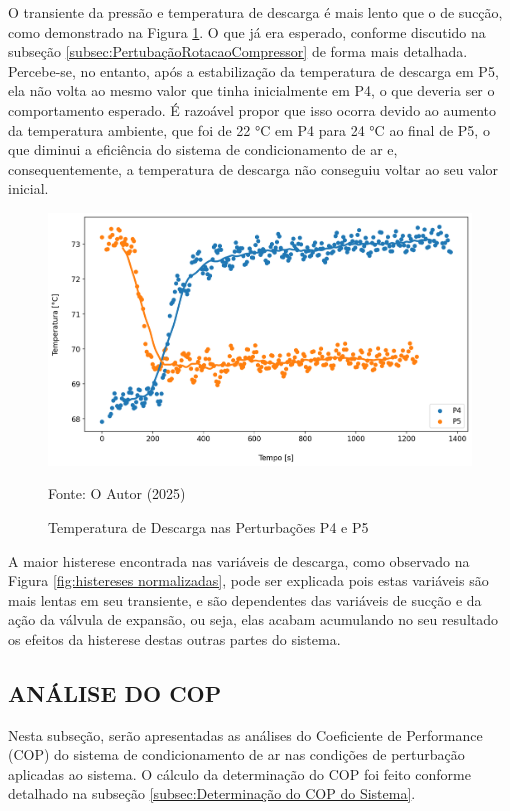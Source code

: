 O transiente da pressão e temperatura de descarga é mais lento que o de sucção, como demonstrado na Figura \ref{fig:TempDescargaSubidaeDescida}. O que já era esperado, conforme discutido na subseção \ref{subsec:PertubaçãoRotacaoCompressor} de forma mais detalhada.
Percebe-se, no entanto, após a estabilização da temperatura de descarga em P5, ela não volta ao mesmo valor que tinha inicialmente em P4, o que deveria ser o comportamento esperado. É razoável propor que isso ocorra devido ao aumento da temperatura ambiente, que foi de 22 °C em P4 para 24 °C ao final de P5, o que diminui a eficiência do sistema de condicionamento de ar e, consequentemente, a temperatura de descarga não conseguiu voltar ao seu valor inicial.
\newpage
\begin{figure}[h]
    \centering
    \includegraphics[width=1\linewidth]{FigurasdoTexto/Temperatura de Descargahyst.png}
    \caption{Temperatura de Descarga  nas Perturbações P4 e P5}
    \label{fig:TempDescargaSubidaeDescida}
    {\footnotesize Fonte: O Autor (2025)}
\end{figure}

A maior histerese encontrada nas variáveis de descarga, como observado na Figura \ref{fig:histereses normalizadas}, pode ser explicada pois estas variáveis são mais lentas em seu transiente, e são dependentes das variáveis de sucção e da ação da válvula de expansão, ou seja, elas acabam acumulando no seu resultado os efeitos da histerese destas outras partes do sistema. 

\subsection{\MakeUppercase{Análise do COP}}

Nesta subseção, serão apresentadas as análises do Coeficiente de Performance (COP) do sistema de condicionamento de ar nas condições de perturbação aplicadas ao sistema. O cálculo da determinação do COP foi feito conforme detalhado na subseção \ref{subsec:Determinação do COP do Sistema}.

